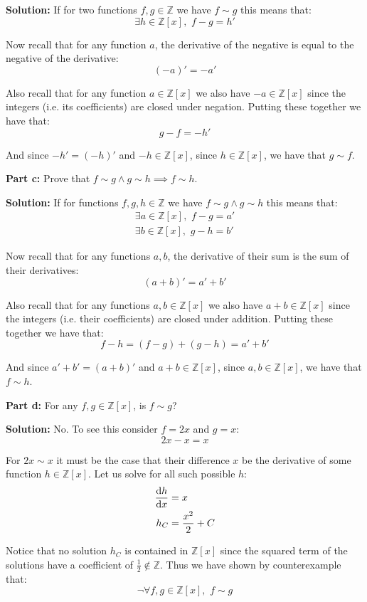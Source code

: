 \documentclass{article}
\begin{document}
\noindent\textbf{Solution:} If for two functions $f,g\in\mathbb Z$ we have $f\sim g$ this means that:
$$\exists h\in\mathbb Z[x],\,\,f-g=h'$$

Now recall that for any function $a$, the derivative of the negative is equal to the negative of the derivative:
$$(-a)'=-a'$$

Also recall that for any function $a\in\mathbb Z[x]$ we also have $-a\in\mathbb Z[x]$ since the integers (i.e. its coefficients) are closed under negation. Putting these together we have that:
$$g-f=-h'$$

And since $-h'=(-h)'$ and $-h\in\mathbb Z[x]$, since $h\in\mathbb Z[x]$, we have that $g\sim f$.
\bigskip

\noindent\textbf{Part c:} Prove that $f\sim g\wedge g\sim h\implies f\sim h$.
\bigskip

\noindent\textbf{Solution:} If for functions $f,g,h\in\mathbb Z$ we have $f\sim g\wedge g\sim h$ this means that:
\begin{align*}
    \exists a\in\mathbb Z[x],\,\,f-g=a'\\
    \exists b\in\mathbb Z[x],\,\,g-h=b'
\end{align*}

Now recall that for any functions $a,b$, the derivative of their sum is the sum of their derivatives:
$$(a+b)'=a'+b'$$

Also recall that for any functions $a,b\in\mathbb Z[x]$ we also have $a+b\in\mathbb Z[x]$ since the integers (i.e. their coefficients) are closed under addition. Putting these together we have that:
$$f-h=(f-g)+(g-h)=a'+b'$$

And since $a'+b'=(a+b)'$ and $a+b\in\mathbb Z[x]$, since $a,b\in\mathbb Z[x]$, we have that $f\sim h$.
\bigskip

\noindent\textbf{Part d:} For any $f,g\in\mathbb Z[x]$, is $f\sim g$?
\bigskip

\noindent\textbf{Solution:} No. To see this consider $f=2x$ and $g=x$:
$$2x-x=x$$

For $2x\sim x$ it must be the case that their difference $x$ be the derivative of some function $h\in\mathbb Z[x]$. Let us solve for all such possible $h$:
\begin{align*}
    \dv{h}{x}&=x\\
    h_C&=\frac{x^2}{2}+C
\end{align*}

Notice that no solution $h_C$ is contained in $\mathbb Z[x]$ since the squared term of the solutions have a coefficient of $\frac{1}{2}\not\in\mathbb Z$. Thus we have shown by counterexample that:
$$\neg\forall f,g\in\mathbb Z[x],\,\,f\sim g$$
\end{document}
